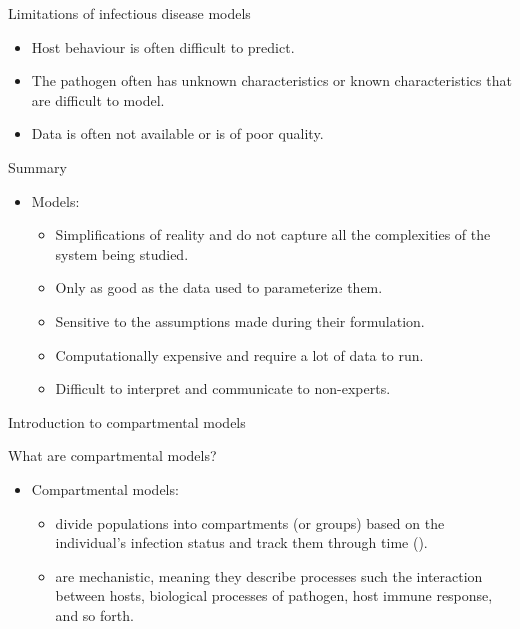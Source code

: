 \documentclass[
  ignorenonframetext,
]{beamer}
\providecommand{\tightlist}{%
  \setlength{\itemsep}{0pt}\setlength{\parskip}{0pt}}\usepackage{longtable,booktabs,array}
\begin{document}
\begin{frame}
\begin{block}{Limitations of infectious disease models}
\label{limitations-of-infectious-disease-models}
\begin{itemize}
\tightlist
\item
  Host behaviour is often difficult to predict.
\item
  The pathogen often has unknown characteristics or known
  characteristics that are difficult to model.
\item
  Data is often not available or is of poor quality.
\end{itemize}
\end{block}
\end{frame}

\begin{frame}
\begin{block}{Summary}
\label{summary}
\begin{itemize}
\tightlist
\item
  Models:

  \begin{itemize}
  \tightlist
  \item
    {Simplifications of reality} and do not capture all the
    {complexities} of the system being studied.
  \item
    Only as good as the {data} used to parameterize them.
  \item
    Sensitive to the {assumptions} made during their formulation.
  \item
    {Computationally expensive} and require a lot of data to run.
  \item
    {Difficult to interpret} and communicate to non-experts.
  \end{itemize}
\end{itemize}
\end{block}
\end{frame}

\begin{frame}{Introduction to compartmental models}
\label{introduction-to-compartmental-models}
\begin{block}{What are compartmental models?}
\label{what-are-compartmental-models}
\begin{itemize}
\tightlist
\item
  Compartmental models:

  \begin{itemize}
  \tightlist
  \item
    divide populations into compartments (or groups) based on the
    individual's infection status and track them through time
    ().
  \item
    are mechanistic, meaning they describe processes such the
    interaction between hosts, biological processes of pathogen, host
    immune response, and so forth.
  \end{itemize}
\end{itemize}
\end{block}
\end{frame}
\end{document}
